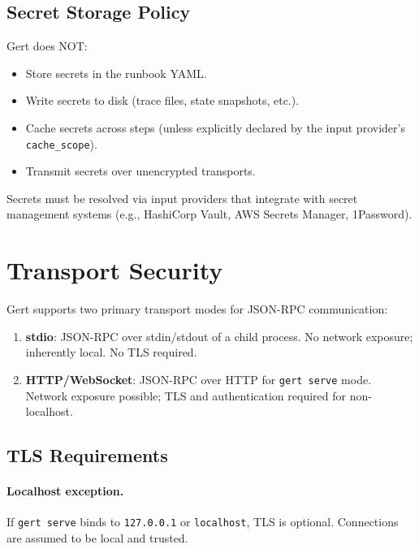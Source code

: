 \subsection{Secret Storage Policy}

Gert does NOT:

\begin{itemize}
  \item Store secrets in the runbook YAML.
  \item Write secrets to disk (trace files, state snapshots, etc.).
  \item Cache secrets across steps (unless explicitly declared by the input
        provider's \texttt{cache\_scope}).
  \item Transmit secrets over unencrypted transports.
\end{itemize}

Secrets must be resolved via input providers that integrate with secret
management systems (e.g., HashiCorp Vault, AWS Secrets Manager, 1Password).

\section{Transport Security}
\label{sec:transport-security}

Gert supports two primary transport modes for JSON-RPC communication:

\begin{enumerate}
  \item \textbf{stdio}: JSON-RPC over stdin/stdout of a child process.  No
        network exposure; inherently local.  No TLS required.
  \item \textbf{HTTP/WebSocket}: JSON-RPC over HTTP for \texttt{gert serve}
        mode.  Network exposure possible; TLS and authentication required for
        non-localhost.
\end{enumerate}

\subsection{TLS Requirements}

\paragraph{Localhost exception.}
If \texttt{gert serve} binds to \texttt{127.0.0.1} or \texttt{localhost}, TLS
is optional.  Connections are assumed to be local and trusted.

